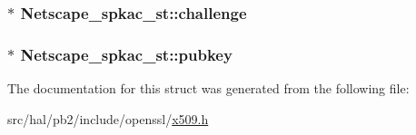 \subsubsection[{\texorpdfstring{challenge}{challenge}}]{$\ast$ Netscape\+\_\+spkac\+\_\+st\+::challenge}\hypertarget{struct_netscape__spkac__st_a7d21d91f0b8eab8b5fca8d3adef478ba}{}\label{struct_netscape__spkac__st_a7d21d91f0b8eab8b5fca8d3adef478ba}
\subsubsection[{\texorpdfstring{pubkey}{pubkey}}]{$\ast$ Netscape\+\_\+spkac\+\_\+st\+::pubkey}\hypertarget{struct_netscape__spkac__st_ae1285ccf2bfbc84f2d57085f39a9bcd2}{}\label{struct_netscape__spkac__st_ae1285ccf2bfbc84f2d57085f39a9bcd2}


The documentation for this struct was generated from the following file\+:\begin{DoxyCompactItemize}
\item 
src/hal/pb2/include/openssl/\hyperlink{x509_8h}{x509.\+h}\end{DoxyCompactItemize}
